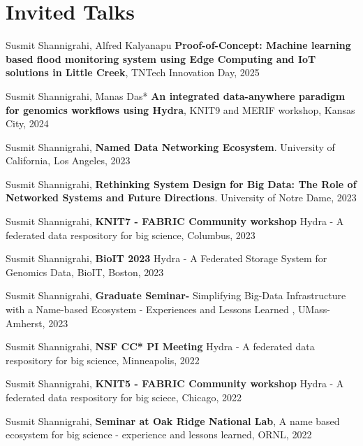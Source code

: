 
\section{Invited Talks}

\begin{etaremune}

\item Susmit Shannigrahi, Alfred Kalyanapu \textbf{Proof-of-Concept: Machine learning based flood monitoring system using Edge Computing and IoT solutions in Little Creek}, TNTech Innovation Day, 2025

\item Susmit Shannigrahi, Manas Das* \textbf{An integrated data-anywhere paradigm for genomics workflows using Hydra}, KNIT9 and MERIF workshop, Kansas City, 2024


\item Susmit Shannigrahi, \textbf{Named Data Networking Ecosystem}. University of California, Los Angeles, 2023


\item Susmit Shannigrahi, \textbf{Rethinking System Design for Big Data: The Role of Networked Systems and Future Directions}. University of Notre Dame, 2023

\item Susmit Shannigrahi, \textbf{KNIT7 -  FABRIC Community workshop} Hydra - A federated data respository for big science, Columbus, 2023

\item Susmit Shannigrahi, \textbf{BioIT 2023} Hydra - A Federated Storage System for Genomics Data, BioIT, Boston, 2023

\item Susmit Shannigrahi, \textbf{Graduate Seminar-} Simplifying Big-Data Infrastructure with a Name-based Ecosystem - Experiences and Lessons Learned , UMass-Amherst, 2023

\item Susmit Shannigrahi, \textbf{NSF CC* PI Meeting} Hydra - A federated data respository for big science, Minneapolis, 2022

\item Susmit Shannigrahi, \textbf{KNIT5 -  FABRIC Community workshop} Hydra - A federated data respository for big sciece, Chicago, 2022

\item Susmit Shannigrahi, \textbf{Seminar at Oak Ridge National Lab}, A name based ecosystem for big science - experience and lessons learned, ORNL, 2022


\end{etaremune}
